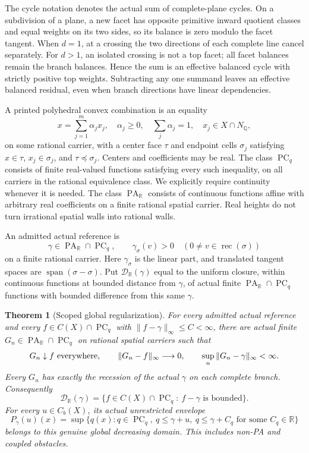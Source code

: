 \documentclass[11pt]{article}
\newtheorem{theorem}{Theorem}
\newcommand{\R}{\mathbb R}
\newcommand{\Q}{\mathbb Q}
\newcommand{\PC}{\operatorname{PC}_{q}}
\newcommand{\PA}{\operatorname{PA}_{\R}}
\newcommand{\rec}{\operatorname{rec}}
\begin{document}
The cycle notation denotes the actual sum of complete-plane cycles. On a subdivision of a plane, a new facet has opposite primitive inward quotient classes and equal weights on its two sides, so its balance is zero modulo the facet tangent. When $d=1$, at a crossing the two directions of each complete line cancel separately. For $d>1$, an isolated crossing is not a top facet; all facet balances remain the branch balances. Hence the sum is an effective balanced cycle with strictly positive top weights. Subtracting any one summand leaves an effective balanced residual, even when branch directions have linear dependencies.

A printed polyhedral convex combination is an equality
\[
 x=\sum_{j=1}^m\alpha_jx_j,\quad \alpha_j\geq0,\quad
 \sum_j\alpha_j=1,\quad x_j\in X\cap N_\Q,
\]
on some rational carrier, with a center face $\tau$ and endpoint cells $\sigma_j$ satisfying $x\in\tau$, $x_j\in\sigma_j$, and $\tau\preceq\sigma_j$. Centers and coefficients may be real. The class $\PC$ consists of finite real-valued functions satisfying every such inequality, on all carriers in the rational equivalence class. We explicitly require continuity whenever it is needed. The class $\PA$ consists of continuous functions affine with arbitrary real coefficients on a finite rational spatial carrier. Real heights do not turn irrational spatial walls into rational walls.

An admitted actual reference is
\[
 \gamma\in\PA\cap\PC,\qquad
 \gamma_\sigma(v)>0\quad(0\ne v\in\rec(\sigma))
\]
on a finite rational carrier. Here $\gamma_\sigma$ is the linear part, and translated tangent spaces are $\operatorname{span}(\sigma-\sigma)$. Put $\mathcal D_\R(\gamma)$ equal to the uniform closure, within continuous functions at bounded distance from $\gamma$, of actual finite $\PA\cap\PC$ functions with bounded difference from this same $\gamma$.

\begin{theorem}[Scoped global regularization]\label{main}
For every admitted actual reference and every $f\in C(X)\cap\PC$ with $\|f-\gamma\|_\infty\leq C<\infty$, there are actual finite $G_n\in\PA\cap\PC$ on rational spatial carriers such that
\[
 G_n\downarrow f\ \hbox{everywhere},\qquad
 \|G_n-f\|_\infty\longrightarrow0,\qquad
 \sup_n\|G_n-\gamma\|_\infty<\infty.
\]
Every $G_n$ has exactly the recession of the actual $\gamma$ on each complete branch. Consequently
\[
 \mathcal D_\R(\gamma)=\{f\in C(X)\cap\PC:\ f-\gamma\text{ is bounded}\}.
\]
For every $u\in C_b(X)$, its actual unrestricted envelope
\[
 P_\gamma(u)(x)=\sup\{q(x):q\in\PC,\ q\leq\gamma+u,
                      \ q\leq\gamma+C_q\text{ for some }C_q\in\R\}
\]
belongs to this genuine global decreasing domain. This includes non-PA and coupled obstacles.
\end{theorem}
\end{document}
